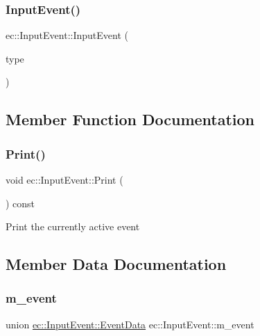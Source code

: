 \subsubsection{\texorpdfstring{Input\+Event()}{InputEvent()}\hspace{0.1cm}{\footnotesize\ttfamily [2/2]}}
{\footnotesize\ttfamily ec\+::\+Input\+Event\+::\+Input\+Event (\begin{DoxyParamCaption}\item[{const \mbox{\hyperlink{namespaceec_a5de6bdb8c4b2ed6e590e721ec998f964}{Input\+Type}}}]{type }\end{DoxyParamCaption})\hspace{0.3cm}{\ttfamily [explicit]}}



\subsection{Member Function Documentation}
\mbox{\label{structec_1_1_input_event_a1ecc94cf2e36938b8bfc1c413de6ba04}} 
\subsubsection{\texorpdfstring{Print()}{Print()}}
{\footnotesize\ttfamily void ec\+::\+Input\+Event\+::\+Print (\begin{DoxyParamCaption}{ }\end{DoxyParamCaption}) const}

Print the currently active event 

\subsection{Member Data Documentation}
\mbox{\label{structec_1_1_input_event_a8d146eaa61615d0e9f680f68d920835c}} 
\subsubsection{\texorpdfstring{m\+\_\+event}{m\_event}}
{\footnotesize\ttfamily union \mbox{\hyperlink{unionec_1_1_input_event_1_1_event_data}{ec\+::\+Input\+Event\+::\+Event\+Data}}  ec\+::\+Input\+Event\+::m\+\_\+event}

